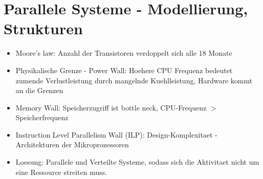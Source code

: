 \chapter{Parallele Systeme - Modellierung, Strukturen}
\begin{itemize}
	\setlength\itemsep{0em}
	\item Moore's law: Anzahl der Transistoren verdoppelt sich alle 18 Monate
	\item Physikalische Grenze - Power Wall: Hoehere CPU Frequenz bedeutet zumende Verlustleistung durch mangelnde Kuehlleistung, Hardware kommt an die Grenzen
	\item Memory Wall: Speicherzugriff ist bottle neck, CPU-Frequenz $>$ Speicherfrequenz
	\item Instruction Level Parallelism Wall (ILP): Design-Komplexitaet - Architekturen der Mikroprozessoren
	\item Loesung: Parallele und Verteilte Systeme, sodass sich die Aktivitaet nicht um eine Ressource streiten muss. 
\end{itemize}
